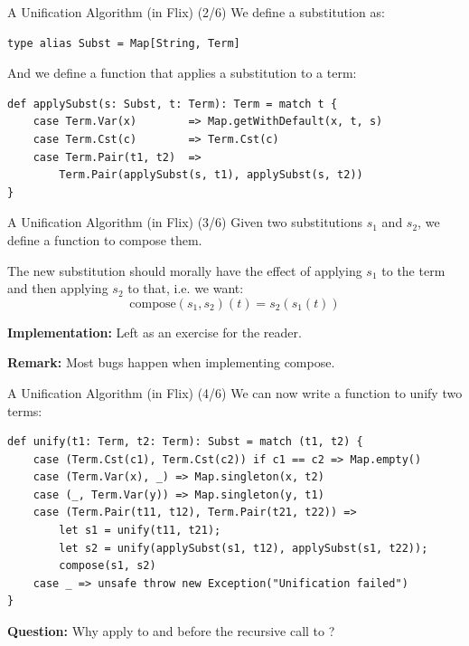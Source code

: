 \begin{frame}[fragile]{A Unification Algorithm (in Flix) (2/6)}
We define a substitution as:

\begin{lstlisting}[language=flix, xleftmargin=0.5cm]
type alias Subst = Map[String, Term]
\end{lstlisting}

\pause

And we define a function that applies a substitution to a term:

\begin{lstlisting}[language=flix, xleftmargin=0.5cm]
def applySubst(s: Subst, t: Term): Term = match t {
    case Term.Var(x)        => Map.getWithDefault(x, t, s)
    case Term.Cst(c)        => Term.Cst(c)
    case Term.Pair(t1, t2)  => 
        Term.Pair(applySubst(s, t1), applySubst(s, t2))
}
\end{lstlisting}
\end{frame}

\begin{frame}[fragile]{A Unification Algorithm (in Flix) (3/6)}
Given two substitutions $s_1$ and $s_2$, we define a function to compose them.

The new substitution should morally have the effect of applying $s_1$ to the
term and then applying $s_2$ to that, i.e. we want:
%
\[
    \text{compose}(s_1, s_2)(t) = s_2(s_1(t))
\]

\textbf{Implementation:} Left as an exercise for the reader.

\textbf{Remark:} Most bugs happen when implementing compose. 
\end{frame}

\begin{frame}[fragile]{A Unification Algorithm (in Flix) (4/6)}
We can now write a function to unify two terms:

\begin{lstlisting}[language=flix, xleftmargin=0.5cm]
def unify(t1: Term, t2: Term): Subst = match (t1, t2) {
    case (Term.Cst(c1), Term.Cst(c2)) if c1 == c2 => Map.empty()
    case (Term.Var(x), _) => Map.singleton(x, t2)
    case (_, Term.Var(y)) => Map.singleton(y, t1)
    case (Term.Pair(t11, t12), Term.Pair(t21, t22)) => 
        let s1 = unify(t11, t21);
        let s2 = unify(applySubst(s1, t12), applySubst(s1, t22));
        compose(s1, s2)
    case _ => unsafe throw new Exception("Unification failed")
}
\end{lstlisting}

\pause

\textbf{Question:} Why apply  to  and  before the
recursive call to ?
\end{frame}  

